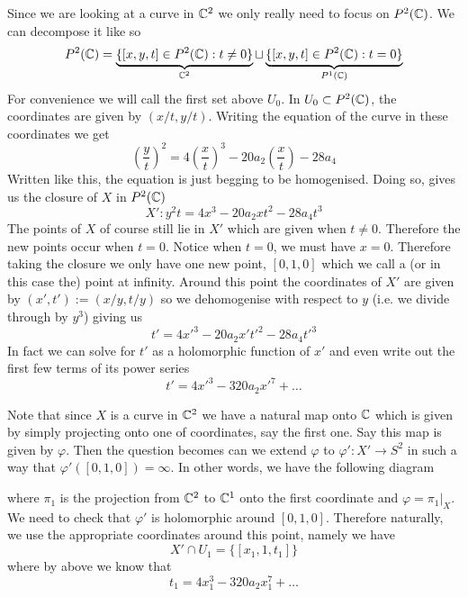Since we are looking at a curve in $\mathbb{C}^2$ we only really need to focus on $P^2(\mathbb{C})$. We can decompose it like so
$$P^2(\mathbb{C}) = \underbrace{\{[x, y, t] \in P^2(\mathbb{C}): t \neq 0\}}_{\mathbb{C}^2} \sqcup \underbrace{\{[x, y, t] \in P^2(\mathbb{C}): t = 0\}}_{P^1(\mathbb{C})}$$
For convenience we will call the first set above $U_0$. In $U_0 \subset P^2(\mathbb{C})$, the coordinates are given by $(x/t, y/t)$. Writing the equation of the curve in these coordinates we get 
$$ \left( \frac{y}{t} \right)^2 = 4 \left( \frac{x}{t} \right)^3 - 20a_2 \left( \frac{x}{t} \right) - 28a_4$$
Written like this, the equation is just begging to be homogenised. Doing so, gives us the closure of $X$ in $P^2(\mathbb{C})$
$$X': y^2t = 4x^3 - 20a_2 xt^2 - 28a_4t^3$$
The points of $X$ of course still lie in $X'$ which are given when $t \neq 0$. Therefore the new points occur when $t = 0$. Notice when $t = 0$, we must have $x = 0$. Therefore taking the closure we only have one new point, $[0, 1, 0]$ which we call a (or in this case the) point at infinity. Around this point the coordinates of $X'$ are given by $(x', t') := (x/y, t/y)$ so we dehomogenise with respect to $y$ (i.e. we divide through by $y^3$) giving us 
$$t' = 4x'^3 - 20a_2 x' t'^2 - 28a_4t'^3$$
In fact we can solve for $t'$ as a holomorphic function of $x'$ and even write out the first few terms of its power series 
$$t' = 4x'^3 - 320a_2 x'^7 + \dots $$

Note that since $X$ is a curve in $\mathbb{C}^2$ we have a natural map onto $\mathbb{C}$ which is given by simply projecting onto one of coordinates, say the first one. Say this map is given by $\varphi$. Then the question becomes can we extend $\varphi$ to $\varphi': X' \to S^2$ in such a way that $\varphi'([0, 1, 0]) = \infty$. In other words, we have the following diagram

where $\pi_1$ is the projection from $\mathbb{C}^2$ to $\mathbb{C}^1$ onto the first coordinate and $\varphi = \pi_1|_X$. We need to check that $\varphi'$ is holomorphic around $[0, 1, 0]$. Therefore naturally, we use the appropriate coordinates around this point, namely we have 
$$X' \cap U_1 = \{[x_1, 1, t_1]\}$$
where by above we know that 
$$t_1 = 4x_1^3 - 320a_2 x_1^7 + \dots$$

